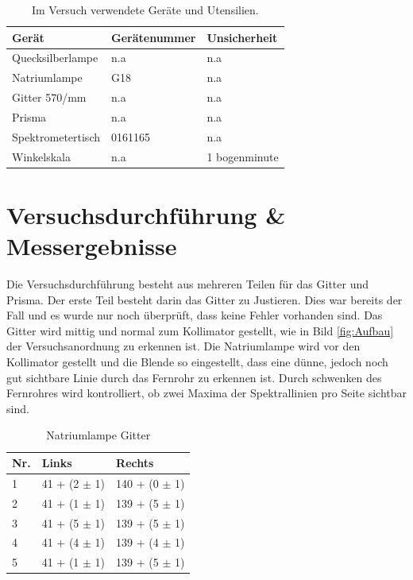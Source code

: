 \documentclass[12pt,a4paper,twoside]{article}
\begin{document}
    \begin{table}[H]
        \centering
        \caption{Im Versuch verwendete Geräte und Utensilien.}
        \label{tab:geraete}
        \begin{tabular}{| l | l | l |}
            \hline
            Gerät  & Gerätenummer  & Unsicherheit \\
            \hline
            Quecksilberlampe & {n.a} & {n.a} \\
            Natriumlampe & G18 & {n.a} \\
            Gitter 570/mm & {n.a} & {n.a} \\
            Prisma & {n.a} & {n.a} \\
            Spektrometertisch & 0161165 & {n.a} \\
            Winkelskala & {n.a} & 1 bogenminute \\
            \hline
        \end{tabular}
    \end{table}


\section{Versuchsdurchführung \& Messergebnisse} %
Die Versuchsdurchführung besteht aus mehreren Teilen für das Gitter und Prisma. 
Der erste Teil besteht darin das Gitter zu Justieren. Dies war bereits der Fall und es wurde nur noch überprüft, dass keine Fehler vorhanden sind. Das Gitter wird mittig und normal zum Kollimator gestellt, wie in Bild \ref{fig:Aufbau} der Versuchsanordnung zu erkennen ist. 
Die Natriumlampe wird vor den Kollimator gestellt und die Blende so eingestellt, dass eine dünne, jedoch noch gut sichtbare Linie durch das Fernrohr zu erkennen ist. 
Durch schwenken des Fernrohres wird kontrolliert, ob zwei Maxima der Spektrallinien pro Seite sichtbar sind. 


\begin{table}[H]
    \centering
    \caption{Natriumlampe Gitter}
    \label{tab:Gitter v1}
    \begin{tabular}{| l | l | l |}
        \hline
        Nr.  & Links  & Rechts \\
        \hline
        1 & 41 + (2 $\pm$ 1) & 140 + (0 $\pm$ 1) \\
        2 & 41 + (1 $\pm$ 1) & 139 + (5 $\pm$ 1) \\
        3 & 41 + (5 $\pm$ 1) & 139 + (5 $\pm$ 1) \\
        4 & 41 + (4 $\pm$ 1) & 139 + (4 $\pm$ 1) \\
        5 & 41 + (1 $\pm$ 1) & 139 + (5 $\pm$ 1) \\
        \hline
    \end{tabular}
\end{table}
\end{document}
